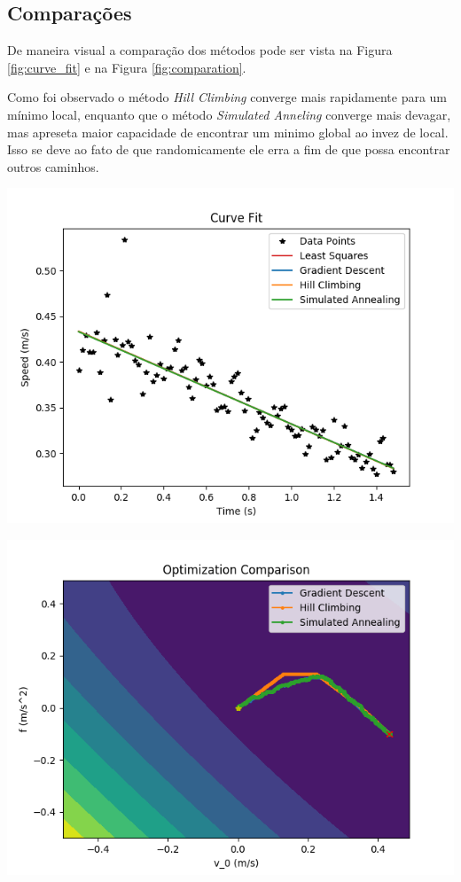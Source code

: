 \documentclass[a4paper, 9pt]{article}
\newenvironment{Figure}
  {\par\medskip\noindent\minipage{\linewidth}}
  {\endminipage\par\medskip}
\theoremstyle{plain}
\theoremstyle{definition}
\theoremstyle{definition}
\theoremstyle{definition}
\begin{document}
\begin{multicols}{2}

\section*{Comparações}

De maneira visual a comparação dos métodos pode ser vista na Figura \ref{fig:curve_fit} e na Figura \ref{fig:comparation}.

Como foi observado o método \textit{Hill Climbing} converge mais rapidamente para um mínimo local, enquanto que o método \textit{Simulated Anneling} converge mais devagar, mas apreseta maior capacidade de encontrar um minimo global ao invez de local. Isso se deve ao fato de que randomicamente ele erra a fim de que possa encontrar outros caminhos.

\begin{Figure}
    \centering
    \includegraphics[width=\linewidth]
    {./../code/fit_comparison.png}
    \label{fig:curve_fit}
\end{Figure}

\begin{Figure}
    \centering
    \includegraphics[width=\linewidth]
    {./../code/optimization_comparison.png}
    \label{fig:comparation}
\end{Figure}


\end{multicols}
\end{document}
